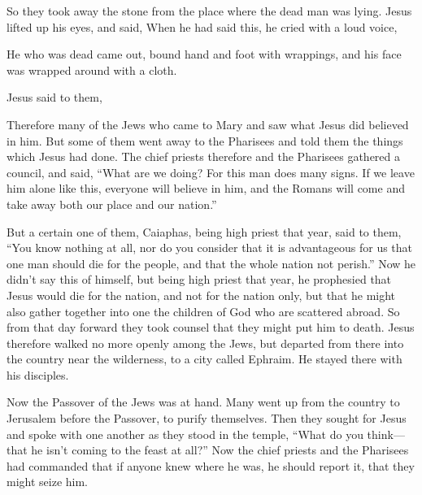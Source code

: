{\par }{\PP {}So they took away the stone from the place where the dead man was lying. Jesus lifted up his eyes, and said,
{}
When he had said this, he cried with a loud voice,
{}
\par }{\PP {}He who was dead came out, bound hand and foot with wrappings, and his face was wrapped around with a cloth.
\par }{\PP Jesus said to them,
{}
\par }{\PP {}Therefore many of the Jews who came to Mary and saw what Jesus did believed in him.
But some of them went away to the Pharisees and told them the things which Jesus had done.
The chief priests therefore and the Pharisees gathered a council, and said, “What are we doing? For this man does many signs.
If we leave him alone like this, everyone will believe in him, and the Romans will come and take away both our place and our nation.”
\par }{\PP {}But a certain one of them, Caiaphas, being high priest that year, said to them, “You know nothing at all,
nor do you consider that it is advantageous for us that one man should die for the people, and that the whole nation not perish.”
Now he didn’t say this of himself, but being high priest that year, he prophesied that Jesus would die for the nation,
and not for the nation only, but that he might also gather together into one the children of God who are scattered abroad.
So from that day forward they took counsel that they might put him to death.
Jesus therefore walked no more openly among the Jews, but departed from there into the country near the wilderness, to a city called Ephraim. He stayed there with his disciples.
\par }{\PP {}Now the Passover of the Jews was at hand. Many went up from the country to Jerusalem before the Passover, to purify themselves.
Then they sought for Jesus and spoke with one another as they stood in the temple, “What do you think—that he isn’t coming to the feast at all?”
Now the chief priests and the Pharisees had commanded that if anyone knew where he was, he should report it, that they might seize him.

}
